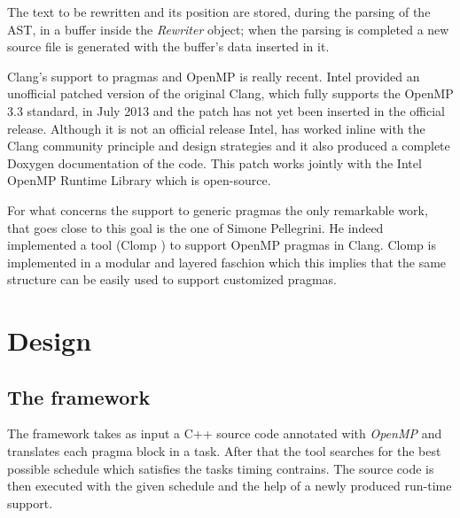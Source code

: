 \documentclass[a4paper,11pt,oneside]{book}
\begin{document}
The text to be rewritten and its position are stored, during the parsing of the AST, in a buffer inside the \emph{Rewriter} object; when the parsing is completed a new source file is generated with the buffer’s data inserted in it.  

Clang’s support to pragmas and OpenMP is really recent. Intel provided an unofficial patched version of the original Clang, which fully supports the OpenMP 3.3 standard, in July 2013 and the patch has not yet been inserted in the official release. Although it is not an official release Intel, has worked inline with the Clang community principle and design strategies and it also produced a complete Doxygen documentation of the code. This patch works jointly with the Intel OpenMP Runtime Library \cite{intelomprtl} which is open-source. 

For what concerns the support to generic pragmas the only remarkable work, that goes close to this goal is the one of Simone Pellegrini. He indeed implemented a tool (Clomp \cite{clomp}) to support OpenMP pragmas in Clang. Clomp is implemented in a modular and layered faschion which this implies that the same structure can be easily used to support customized pragmas.
 



\chapter{Design}
\section{The framework}

The framework takes as input a C++ source code annotated with \emph{OpenMP} and translates each pragma block in a task. After that the tool searches for the best possible schedule which satisfies the tasks timing contrains. The source code is then executed with the given schedule and the help of a newly produced run-time support.
\end{document}
